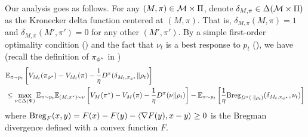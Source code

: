 Our analysis goes as follows. For any $(M,\pi)\in\mathcal{M}\times\Pi$,  denote $\delta_{M,\pi}\in \Delta(\mathcal{M}\times \Pi)$ as the Kronecker delta function centered at $(M,\pi)$. That is, $\delta_{M,\pi}(M,\pi)=1$ and $\delta_{M,\pi}(M',\pi')=0$ for any other $(M',\pi')$. By a simple first-order optimality condition () and the fact that $\nu_t$ is a best response to $p_t$ (), we have (recall the definition of $\pi_{\phi^\star}$ in )
\begin{align}
    &\mathbb{E}_{\pi \sim p_t}\left[V_{M_t}(\pi_{\phi^\star}) - V_{M_t}(\pi) - \frac{1}{\eta}D^\pi(\delta_{M_t, \pi_{\phi^\star}} \| \rho_t)\right]  \label{eq:general-decom}
    \\&\le \max_{\nu \in \Delta(\Psi)}\mathbb{E}_{\pi \sim p_t}\mathbb{E}_{(M,\pi^\star) \sim \nu}\left[V_{M}(\pi^\star) -V_{M}(\pi) - \frac{1}{\eta}D^\pi(\nu\| \rho_t)\right] - \mathbb{E}_{\pi \sim p_t}\left[\frac{1}{\eta} \textup{Breg}_{D^\pi(\cdot\|\rho_t)}(\delta_{M_t, \pi_{\phi^\star}},  \nu_t)\right] \nonumber
\end{align}
where $\textup{Breg}_{F}(x,y) = F(x) - F(y) - \left\langle\nabla F(y), x-y\right\rangle\geq 0$ is the Bregman divergence defined with a convex function $F$. %
